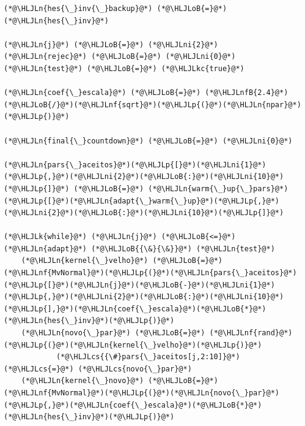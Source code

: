 \documentclass[12pt,a4paper]{article}
\newcommand{\HLJLk}[1]{\textcolor[RGB]{148,91,176}{\textbf{#1}}}
\newcommand{\HLJLkc}[1]{\textcolor[RGB]{59,151,46}{\textit{#1}}}
\newcommand{\HLJLn}[1]{#1}
\newcommand{\HLJLnf}[1]{\textcolor[RGB]{66,102,213}{#1}}
\newcommand{\HLJLnfB}[1]{\textcolor[RGB]{59,151,46}{#1}}
\newcommand{\HLJLni}[1]{\textcolor[RGB]{59,151,46}{#1}}
\newcommand{\HLJLoB}[1]{\textcolor[RGB]{102,102,102}{\textbf{#1}}}
\newcommand{\HLJLp}[1]{#1}
\newcommand{\HLJLcs}[1]{\textcolor[RGB]{153,153,119}{\textit{#1}}}
\begin{document}
\begin{lstlisting}
(*@\HLJLn{hes{\_}inv{\_}backup}@*) (*@\HLJLoB{=}@*) (*@\HLJLn{hes{\_}inv}@*)

(*@\HLJLn{j}@*) (*@\HLJLoB{=}@*) (*@\HLJLni{2}@*)
(*@\HLJLn{rejec}@*) (*@\HLJLoB{=}@*) (*@\HLJLni{0}@*)
(*@\HLJLn{test}@*) (*@\HLJLoB{=}@*) (*@\HLJLkc{true}@*)

(*@\HLJLn{coef{\_}escala}@*) (*@\HLJLoB{=}@*) (*@\HLJLnfB{2.4}@*)(*@\HLJLoB{/}@*)(*@\HLJLnf{sqrt}@*)(*@\HLJLp{(}@*)(*@\HLJLn{npar}@*)(*@\HLJLp{)}@*)

(*@\HLJLn{final{\_}countdown}@*) (*@\HLJLoB{=}@*) (*@\HLJLni{0}@*)

(*@\HLJLn{pars{\_}aceitos}@*)(*@\HLJLp{[}@*)(*@\HLJLni{1}@*)(*@\HLJLp{,}@*)(*@\HLJLni{2}@*)(*@\HLJLoB{:}@*)(*@\HLJLni{10}@*)(*@\HLJLp{]}@*) (*@\HLJLoB{=}@*) (*@\HLJLn{warm{\_}up{\_}pars}@*)(*@\HLJLp{[}@*)(*@\HLJLn{adapt{\_}warm{\_}up}@*)(*@\HLJLp{,}@*)(*@\HLJLni{2}@*)(*@\HLJLoB{:}@*)(*@\HLJLni{10}@*)(*@\HLJLp{]}@*)

(*@\HLJLk{while}@*) (*@\HLJLn{j}@*) (*@\HLJLoB{<=}@*) (*@\HLJLn{adapt}@*) (*@\HLJLoB{{\&}{\&}}@*) (*@\HLJLn{test}@*)
    (*@\HLJLn{kernel{\_}velho}@*) (*@\HLJLoB{=}@*) (*@\HLJLnf{MvNormal}@*)(*@\HLJLp{(}@*)(*@\HLJLn{pars{\_}aceitos}@*)(*@\HLJLp{[}@*)(*@\HLJLn{j}@*)(*@\HLJLoB{-}@*)(*@\HLJLni{1}@*)(*@\HLJLp{,}@*)(*@\HLJLni{2}@*)(*@\HLJLoB{:}@*)(*@\HLJLni{10}@*)(*@\HLJLp{],}@*)(*@\HLJLn{coef{\_}escala}@*)(*@\HLJLoB{*}@*)(*@\HLJLn{hes{\_}inv}@*)(*@\HLJLp{)}@*)
    (*@\HLJLn{novo{\_}par}@*) (*@\HLJLoB{=}@*) (*@\HLJLnf{rand}@*)(*@\HLJLp{(}@*)(*@\HLJLn{kernel{\_}velho}@*)(*@\HLJLp{)}@*)
            (*@\HLJLcs{{\#}pars{\_}aceitos[j,2:10]}@*) (*@\HLJLcs{=}@*) (*@\HLJLcs{novo{\_}par}@*)
    (*@\HLJLn{kernel{\_}novo}@*) (*@\HLJLoB{=}@*) (*@\HLJLnf{MvNormal}@*)(*@\HLJLp{(}@*)(*@\HLJLn{novo{\_}par}@*)(*@\HLJLp{,}@*)(*@\HLJLn{coef{\_}escala}@*)(*@\HLJLoB{*}@*)(*@\HLJLn{hes{\_}inv}@*)(*@\HLJLp{)}@*)


\end{lstlisting}
\end{document}
